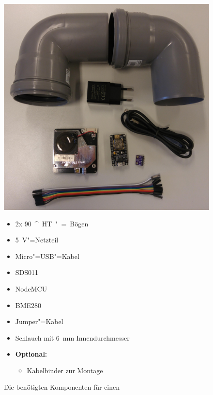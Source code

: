 \begin{figure}[htb]
	\begin{minipage}{0.6\textwidth}
		\centering
		\includegraphics[width=\textwidth]{./ressourcen/SK-HardwareUeberblick.jpg}
	\end{minipage}
	\begin{minipage}{0.35\textwidth}
		\begin{itemize}
			\item 2x \SI{90}{^\circ} HT"=Bögen
			\item \SI{5}{V}"=Netzteil
			\item Micro"=USB"=Kabel
			\item SDS011
			\item NodeMCU
			\item BME280
			\item Jumper"=Kabel
			\item Schlauch mit \SI{6}{mm} Innendurchmesser
			\item \textbf{Optional:} 
			\begin{itemize}
				\item Kabelbinder zur Montage
			\end{itemize}
		\end{itemize}
	\end{minipage}
	\caption{Die benötigten Komponenten für einen \sk}
	\label{fig:skcomponents}
\end{figure}

